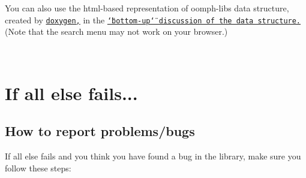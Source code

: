 You can also use the html-\/based representation of {\ttfamily oomph-\/lib\textquotesingle{}s} data structure, created by \href{http://www.doxygen.org}{\tt doxygen,} in the \href{../../the_data_structure/html/index.html}{\tt \char`\"{}bottom-\/up\char`\"{} discussion of the data structure.} (Note that the search menu may not work on your browser.)

~\newline
~\newline


 

\hypertarget{index_all_else_fails}{}\section{If all else fails...}\label{index_all_else_fails}
\hypertarget{index_reporting}{}\subsection{How to report problems/bugs}\label{index_reporting}
If all else fails and you think you have found a bug in the library, make sure you follow these steps\+:
